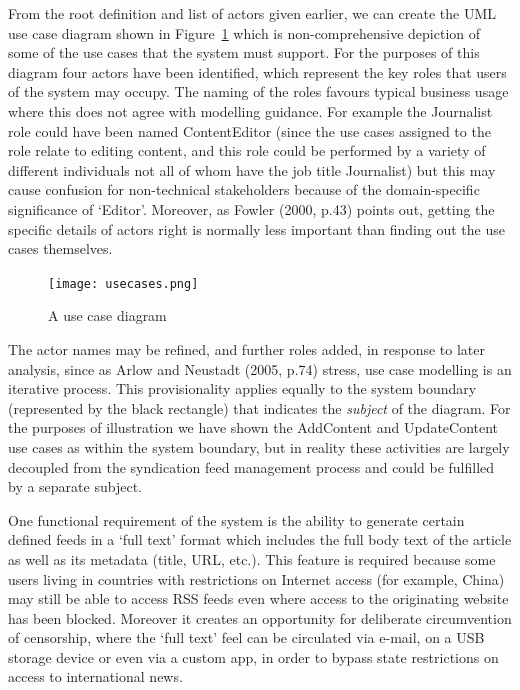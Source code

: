 \documentclass[a4paper]{article}
\begin{document}
From the root definition and list of actors given earlier, we can create the UML use case diagram shown in Figure~\ref{use-cases} which is non-comprehensive depiction of some of the use cases that the system must support. For the purposes of this diagram four actors have been identified, which represent the key roles that users of the system may occupy. The naming of the roles favours typical business usage where this does not agree with modelling guidance. For example the \textsf{Journalist} role could have been named \textsf{ContentEditor} (since the use cases assigned to the role relate to editing content, and this role could be performed by a variety of different individuals not all of whom have the job title \textsf{Journalist}) but this may cause confusion for non-technical stakeholders because of the domain-specific significance of `Editor'. Moreover, as Fowler (2000, p.43) points out, getting the specific details of actors right is normally less important than finding out the use cases themselves.

\begin{figure}
  \texttt{[image: usecases.png]}
  \caption{A use case diagram}
  \label{use-cases}
\end{figure}


The actor names may be refined, and further roles added, in response to later analysis, since as Arlow and Neustadt (2005, p.74) stress, use case modelling is an iterative process. This provisionality applies equally to the system boundary (represented by the black rectangle) that indicates the \textit{subject} of the diagram. For the purposes of illustration we have shown the \textsf{AddContent} and \textsf{UpdateContent} use cases as within the system boundary, but in reality these activities are largely decoupled from the syndication feed management process and could be fulfilled by a separate subject.

One functional requirement of the system is the ability to generate certain defined feeds in a `full text' format which includes the full body text of the article as well as its metadata (title, URL, etc.). This feature is required because some users living in countries with restrictions on Internet access (for example, China) may still be able to access RSS feeds even where access to the originating website has been blocked. Moreover it creates an opportunity for deliberate circumvention of censorship, where the `full text' feel can be circulated via e-mail, on a USB storage device or even via a custom app, in order to bypass state restrictions on access to international news.
\end{document}
